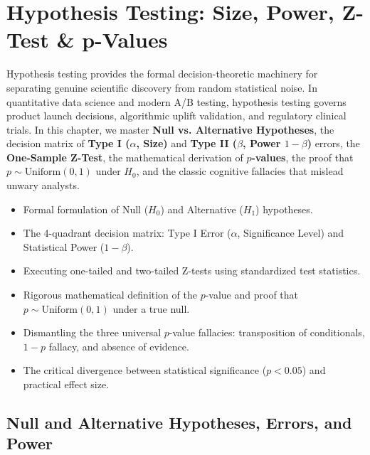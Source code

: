 \chapter{Hypothesis Testing: Size, Power, Z-Test \& p-Values}

Hypothesis testing provides the formal decision-theoretic machinery for separating genuine scientific discovery from random statistical noise. In quantitative data science and modern A/B testing, hypothesis testing governs product launch decisions, algorithmic uplift validation, and regulatory clinical trials. In this chapter, we master \textbf{Null vs. Alternative Hypotheses}, the decision matrix of \textbf{Type I ($\alpha$, Size)} and \textbf{Type II ($\beta$, Power $1-\beta$)} errors, the \textbf{One-Sample Z-Test}, the mathematical derivation of \textbf{$p$-values}, the proof that $p \sim \text{Uniform}(0, 1)$ under $H_0$, and the classic cognitive fallacies that mislead unwary analysts.

\vspace{0.5cm}
\begin{tcolorbox}[colback=primarylight, colframe=primarydark, title={\textbf{What You'll Learn in this Chapter}}]
\begin{itemize}
    \item Formal formulation of Null ($H_0$) and Alternative ($H_1$) hypotheses.
    \item The 4-quadrant decision matrix: Type I Error ($\alpha$, Significance Level) and Statistical Power ($1 - \beta$).
    \item Executing one-tailed and two-tailed Z-tests using standardized test statistics.
    \item Rigorous mathematical definition of the $p$-value and proof that $p \sim \text{Uniform}(0, 1)$ under a true null.
    \item Dismantling the three universal $p$-value fallacies: transposition of conditionals, $1-p$ fallacy, and absence of evidence.
    \item The critical divergence between statistical significance ($p < 0.05$) and practical effect size.
\end{itemize}
\end{tcolorbox}

\section{Null and Alternative Hypotheses, Errors, and Power}


